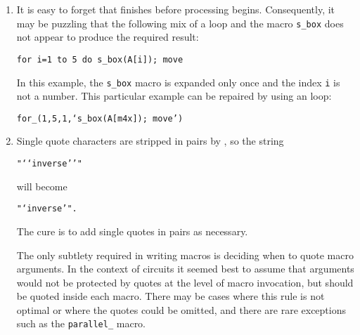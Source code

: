 \begin{enumerate}
{\tt source(up\_)}

\noindent draws a source up a distance equal to the current
{\tt lineht} value, which may cause confusion.
Writing

{\tt source(0.5)}

\noindent draws a source of length 0.5 units
in the current \pic default direction, which is one of
{\tt right,} {\tt left,} {\tt up,} or {\tt down.}
The best practice is
to specify both the direction and length of an element, thus:

{\tt source(up\_ elen\_).}

The effect of a \linespec argument is independent of any direction
set using the {\tt Point\_} or similar macros. 
To draw an element at an obtuse angle (see ) try,
for example,

{\tt Point\_(45); source(to rvec\_(0.5,0))}

\item 
{}
It is easy to forget that \Mfour finishes before \pic processing
begins. Consequently, it may be puzzling that the following mix of
a \pic loop and the \Mfour macro {\tt s\_box} does not appear to produce
the required result:

{\tt for i=1 to 5 do \lbr s\_box(A[i]); move \rbr}

\noindent In this example, the {\tt s\_box} macro is expanded only once
and the index {\tt i} is not a number.  This particular example can be
repaired by using an \Mfour loop:

{\tt for\_(1,5,1,`s\_box(A[m4x]); move')}

\item 
{}
 Single quote characters are stripped in pairs by \Mfour, so the string

{\tt "{`}{`}inverse{'}{'}"}

\noindent will become

{\tt "{`}inverse{'}".}

\noindent The cure is to add single quotes in pairs as necessary.

  The only subtlety required in writing
  \Mfour macros is deciding when to quote macro arguments.  In the context
  of circuits it seemed best to assume that arguments would not
  be protected by quotes at the level of macro invocation, but should
  be quoted inside each macro.  There may be cases where this rule is
  not optimal or where the quotes could be omitted, and there are
  rare exceptions such as the {\tt parallel\_} macro.


\end{enumerate}
